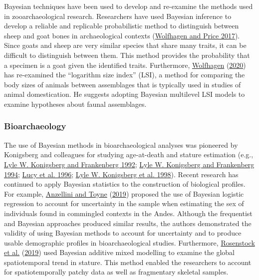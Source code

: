 \documentclass[
]{article}
\begin{document}
Bayesian techniques have been used to develop and re-examine the methods
used in zooarchaeological research. Researchers have used Bayesian
inference to develop a reliable and replicable probabilistic method to
distinguish between sheep and goat bones in archaeological contexts
(\protect\hyperlink{ref-wolfhagen_probabilistic_2017}{Wolfhagen and
Price 2017}). Since goats and sheep are very similar species that share
many traits, it can be difficult to distinguish between them. This
method provides the probability that a specimen is a goat given the
identified traits. Furthermore,
\protect\hyperlink{ref-wolfhagen_re-examining_2020}{Wolfhagen}
(\protect\hyperlink{ref-wolfhagen_re-examining_2020}{2020}) has
re-examined the ``logarithm size index'' (LSI), a method for comparing
the body sizes of animals between assemblages that is typically used in
studies of animal domestication. He suggests adopting Bayesian
multilevel LSI models to examine hypotheses about faunal assemblages.

\hypertarget{bioarchaeology}{%
\subsubsection{Bioarchaeology}\label{bioarchaeology}}

The use of Bayesian methods in bioarchaeological analyses was pioneered
by Konigsberg and colleagues for studying age-at-death and stature
estimation (e.g.,
\protect\hyperlink{ref-konigsberg_estimation_1992}{Lyle W. Konigsberg
and Frankenberg 1992};
\protect\hyperlink{ref-konigsberg_paleodemography_1994}{Lyle W.
Konigsberg and Frankenberg 1994};
\protect\hyperlink{ref-lucy_bayesian_1996}{Lucy et al. 1996};
\protect\hyperlink{ref-konigsberg_stature_1998}{Lyle W. Konigsberg et
al. 1998}). Recent research has continued to apply Bayesian statistics
to the construction of biological profiles. For example,
\protect\hyperlink{ref-anzellini_estimating_2019}{Anzellini and Toyne}
(\protect\hyperlink{ref-anzellini_estimating_2019}{2019}) proposed the
use of Bayesian logistic regression to account for uncertainty in the
sample when estimating the sex of individuals found in commingled
contexts in the Andes. Although the frequentist and Bayesian approaches
produced similar results, the authors demonstrated the validity of using
Bayesian methods to account for uncertainty and to produce usable
demographic profiles in bioarchaeological studies. Furthermore,
\protect\hyperlink{ref-rosenstock_human_2019}{Rosenstock et al.}
(\protect\hyperlink{ref-rosenstock_human_2019}{2019}) used Bayesian
additive mixed modelling to examine the global spatiotemporal trend in
stature. This method enabled the researchers to account for
spatiotemporally patchy data as well as fragmentary skeletal samples.
\end{document}
